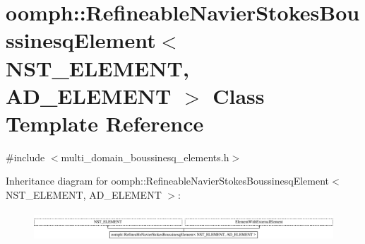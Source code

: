 \hypertarget{classoomph_1_1RefineableNavierStokesBoussinesqElement}{}\section{oomph\+:\+:Refineable\+Navier\+Stokes\+Boussinesq\+Element$<$ N\+S\+T\+\_\+\+E\+L\+E\+M\+E\+NT, A\+D\+\_\+\+E\+L\+E\+M\+E\+NT $>$ Class Template Reference}
\label{classoomph_1_1RefineableNavierStokesBoussinesqElement}


{\ttfamily \#include $<$multi\+\_\+domain\+\_\+boussinesq\+\_\+elements.\+h$>$}

Inheritance diagram for oomph\+:\+:Refineable\+Navier\+Stokes\+Boussinesq\+Element$<$ N\+S\+T\+\_\+\+E\+L\+E\+M\+E\+NT, A\+D\+\_\+\+E\+L\+E\+M\+E\+NT $>$\+:\begin{figure}[H]
\begin{center}
\leavevmode
\includegraphics[height=1.098039cm]{classoomph_1_1RefineableNavierStokesBoussinesqElement}
\end{center}
\end{figure}
